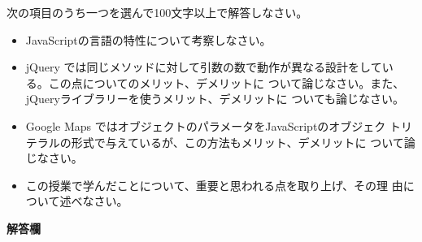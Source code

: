 \documentclass[a4j,12pt]{jreport}
\begin{document}
 \fi
\begin{Prob}\label{lastProb}
 \upshape
 次の項目のうち一つを選んで100文字以上で解答しなさい。
 \begin{itemize}
  \item JavaScriptの言語の特性について考察しなさい。
  \item jQuery では同じメソッドに対して引数の数で動作が異なる設計をしてい
	る。この点についてのメリット、デメリットに
	ついて論じなさい。また、jQueryライブラリーを使うメリット、デメリットに
	ついても論じなさい。
  \item Google Maps ではオブジェクトのパラメータをJavaScriptのオブジェク
	トリテラルの形式で与えているが、この方法もメリット、デメリットに
	ついて論じなさい。
  \item この授業で学んだことについて、重要と思われる点を取り上げ、その理
	由について述べなさい。
 \end{itemize}
 {\bfseries 解答欄}
\end{Prob}
\label{lastPage}
\end{document}
